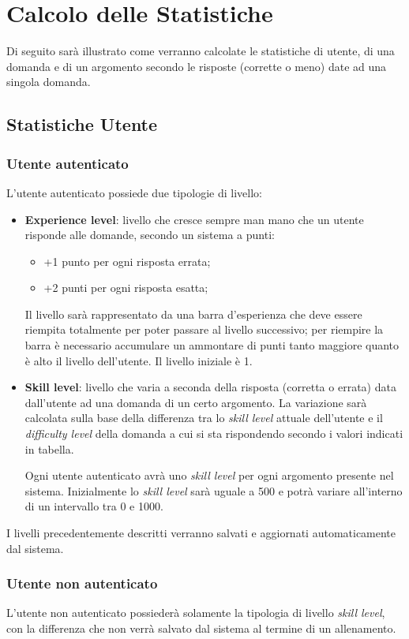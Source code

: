 \section{Calcolo delle Statistiche}
Di seguito sarà illustrato come verranno calcolate le statistiche di utente, di una domanda e di un argomento secondo le risposte (corrette o meno) date ad una singola domanda.

\subsection{Statistiche Utente}
\subsubsection{Utente autenticato}
L'utente autenticato possiede due tipologie di livello:
\begin{itemize}
	\item \textbf{Experience level}: livello che cresce sempre man mano che un utente risponde alle domande, secondo un sistema a punti: 
	\begin{itemize}
		\item +1 punto per ogni risposta errata;
		\item +2 punti per ogni risposta esatta;
	\end{itemize}
	Il livello sarà rappresentato da una barra d'esperienza che deve essere riempita totalmente per poter passare al livello successivo; per riempire la barra è necessario accumulare un ammontare di punti tanto maggiore quanto è alto il livello dell'utente. Il livello iniziale è 1.
	\item \textbf{Skill level}: livello che varia a seconda della risposta (corretta o errata) data dall'utente ad una domanda di un certo argomento. La variazione sarà calcolata sulla base della differenza tra lo \textit{skill level} attuale dell'utente e il \textit{difficulty level} della domanda a cui si sta rispondendo secondo i valori indicati in tabella.
	

Ogni utente autenticato avrà uno \textit{skill level} per ogni argomento presente nel sistema.
Inizialmente lo \textit{skill level} sarà uguale a 500 e potrà variare all'interno di un intervallo tra 0 e 1000.
\end{itemize}
I livelli precedentemente descritti verranno salvati e aggiornati automaticamente dal sistema.

\subsubsection{Utente non autenticato}
L'utente non autenticato possiederà solamente la tipologia di livello \textit{skill level}, con la differenza che non verrà salvato dal sistema al termine di un allenamento. 


